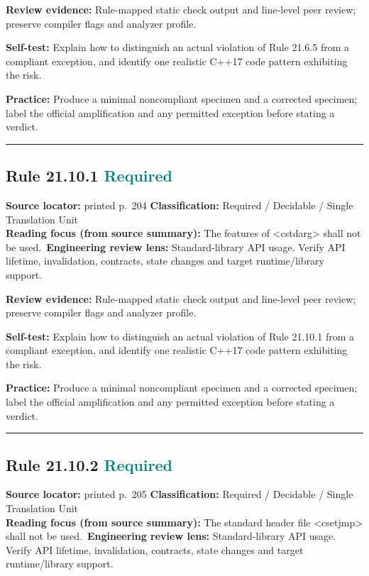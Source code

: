 \documentclass[10pt,letterpaper]{article}
\begin{document}
\textbf{Review evidence:} Rule-mapped static check output and line-level peer review; preserve compiler flags and analyzer profile.

\textbf{Self-test:} Explain how to distinguish an actual violation of Rule 21.6.5 from a compliant exception, and identify one realistic C++17 code pattern exhibiting the risk.\par
\textbf{Practice:} Produce a minimal noncompliant specimen and a corrected specimen; label the official amplification and any permitted exception before stating a verdict.
\smallskip\hrule\smallskip
\subsection*{Rule 21.10.1 \enspace \texorpdfstring{\small\textcolor{teal}{Required}}{Required}}
\noindent\textbf{Source locator:} printed p.~204 \quad\textbf{Classification:} Required / Decidable / Single Translation Unit\\
\textbf{Reading focus (from source summary):} The features of \textless{}cstdarg\textgreater{} shall not be used.\
\textbf{Engineering review lens:} Standard-library API usage. Verify API lifetime, invalidation, contracts, state changes and target runtime/library support.

\textbf{Review evidence:} Rule-mapped static check output and line-level peer review; preserve compiler flags and analyzer profile.

\textbf{Self-test:} Explain how to distinguish an actual violation of Rule 21.10.1 from a compliant exception, and identify one realistic C++17 code pattern exhibiting the risk.\par
\textbf{Practice:} Produce a minimal noncompliant specimen and a corrected specimen; label the official amplification and any permitted exception before stating a verdict.
\smallskip\hrule\smallskip
\subsection*{Rule 21.10.2 \enspace \texorpdfstring{\small\textcolor{teal}{Required}}{Required}}
\noindent\textbf{Source locator:} printed p.~205 \quad\textbf{Classification:} Required / Decidable / Single Translation Unit\\
\textbf{Reading focus (from source summary):} The standard header file \textless{}csetjmp\textgreater{} shall not be used.\
\textbf{Engineering review lens:} Standard-library API usage. Verify API lifetime, invalidation, contracts, state changes and target runtime/library support.
\end{document}
